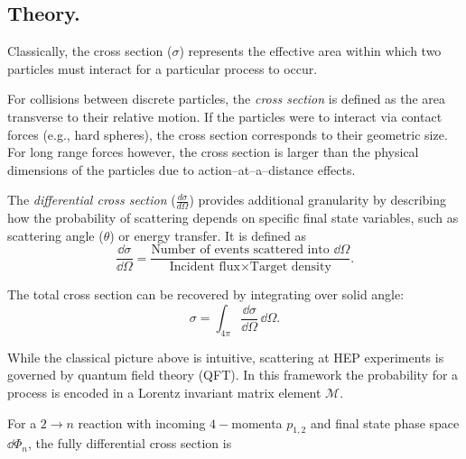 \subsection{Theory.}
    Classically, the cross section (\(\sigma\)) represents the effective area within which two particles must interact for a particular process to occur.
    \begin{definition}
        For collisions between discrete particles, the \emph{cross section} is defined as the area transverse to their relative motion.
        If the particles were to interact via contact forces (e.g., hard spheres), the cross section corresponds to their geometric size.
        For long range forces however, the cross section is larger than the physical dimensions of the particles due to action--at--a--distance effects.
    \end{definition}
%

    \begin{definition}
        The \emph{differential cross section} (\(\frac{d\sigma}{d\Omega}\)) provides additional granularity by describing how the probability of scattering depends on specific final state variables, such as scattering angle (\(\theta\)) or energy transfer.
        It is defined as
        \begin{equation}
            \frac{\dd\sigma}{\dd\Omega} = \frac{\text{Number of events scattered into } \dd\Omega}{\text{Incident flux} \times \text{Target density}}.
        \end{equation}
    \end{definition}

    The total cross section can be recovered by integrating over solid angle:
    \begin{equation}
    \sigma = \int_{4\pi} \frac{\dd\sigma}{\dd\Omega} \, \dd\Omega.
    \end{equation}

    While the classical picture above is intuitive, scattering at HEP experiments is governed by quantum field theory (QFT).
    In this framework the probability for a process is encoded in a Lorentz invariant matrix element \(\mathcal{M}\).
    
    For a \(2 \to n\) reaction with incoming \(4-\)momenta \(p_{1,2}\) and final state phase space \( \dd\Phi_n \), the fully differential cross section is

